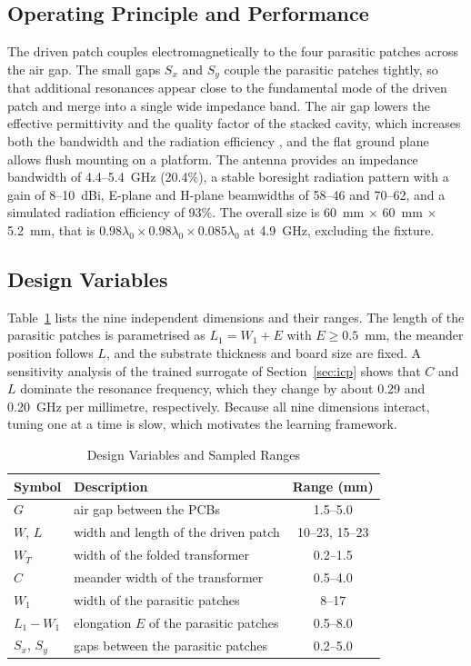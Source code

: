 \documentclass[conference,a4paper]{IEEEtran}
\begin{document}
\subsection{Operating Principle and Performance}
The driven patch couples electromagnetically to the four parasitic patches across the air gap. The small gaps $S_x$ and $S_y$ couple the parasitic patches tightly, so that additional resonances appear close to the fundamental mode of the driven patch and merge into a single wide impedance band. The air gap lowers the effective permittivity and the quality factor of the stacked cavity, which increases both the bandwidth and the radiation efficiency \cite{Legay1993}, and the flat ground plane allows flush mounting on a platform. The antenna provides an impedance bandwidth of 4.4--5.4~GHz (20.4\%), a stable boresight radiation pattern with a gain of 8--10~dBi, E-plane and H-plane beamwidths of 58\textdegree--46\textdegree{} and 70\textdegree--62\textdegree{}, and a simulated radiation efficiency of 93\%. The overall size is 60~mm $\times$ 60~mm $\times$ 5.2~mm, that is $0.98\lambda_0 \times 0.98\lambda_0 \times 0.085\lambda_0$ at 4.9~GHz, excluding the fixture.

\subsection{Design Variables}
Table~\ref{tab:vars} lists the nine independent dimensions and their ranges. The length of the parasitic patches is parametrised as $L_1 = W_1 + E$ with $E \ge 0.5$~mm, the meander position follows $L$, and the substrate thickness and board size are fixed. A sensitivity analysis of the trained surrogate of Section~\ref{sec:icp} shows that $C$ and $L$ dominate the resonance frequency, which they change by about 0.29 and 0.20~GHz per millimetre, respectively. Because all nine dimensions interact, tuning one at a time is slow, which motivates the learning framework.

\begin{table}[!t]
\centering
\caption{Design Variables and Sampled Ranges}
\label{tab:vars}
\footnotesize
\setlength{\tabcolsep}{4pt}
\begin{tabular}{llc}
\toprule
Symbol & Description & Range (mm) \\
\midrule
$G$ & air gap between the PCBs & 1.5--5.0 \\
$W$, $L$ & width and length of the driven patch & 10--23, 15--23 \\
$W_T$ & width of the folded transformer & 0.2--1.5 \\
$C$ & meander width of the transformer & 0.5--4.0 \\
$W_1$ & width of the parasitic patches & 8--17 \\
$L_1-W_1$ & elongation $E$ of the parasitic patches & 0.5--8.0 \\
$S_x$, $S_y$ & gaps between the parasitic patches & 0.2--5.0 \\
\bottomrule
\end{tabular}
\end{table}
\end{document}
